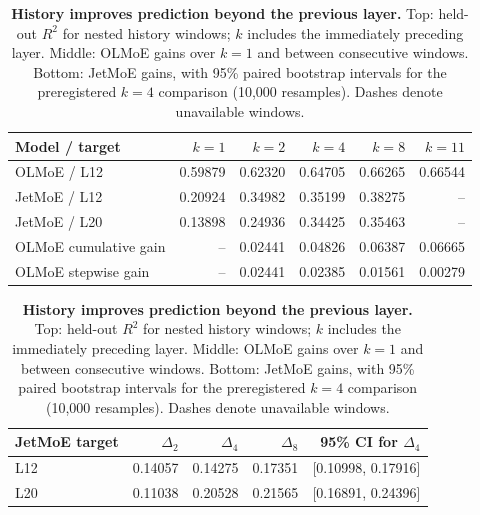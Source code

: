 \begin{table}[t]
\centering\small
\caption{\textbf{History improves prediction beyond the previous layer.} Top: held-out $R^2$ for nested history windows; $k$ includes the immediately preceding layer. Middle: OLMoE gains over $k=1$ and between consecutive windows. Bottom: JetMoE gains, with 95\% paired bootstrap intervals for the preregistered $k=4$ comparison (10,000 resamples). Dashes denote unavailable windows.}
\label{tab:history}
\begin{tabular}{lrrrrr}
\toprule
Model / target & $k=1$ & $k=2$ & $k=4$ & $k=8$ & $k=11$\\
\midrule
OLMoE / L12 & 0.59879 & 0.62320 & 0.64705 & 0.66265 & 0.66544 \\
JetMoE / L12 & 0.20924 & 0.34982 & 0.35199 & 0.38275 & -- \\
JetMoE / L20 & 0.13898 & 0.24936 & 0.34425 & 0.35463 & -- \\
\midrule
OLMoE cumulative gain & -- & 0.02441 & 0.04826 & 0.06387 & 0.06665 \\
OLMoE stepwise gain & -- & 0.02441 & 0.02385 & 0.01561 & 0.00279 \\
\bottomrule
\end{tabular}
\par\smallskip
\begin{tabular}{lrrrr}
\toprule
JetMoE target & $\Delta_2$ & $\Delta_4$ & $\Delta_8$ & 95\% CI for $\Delta_4$\\
\midrule
L12 & 0.14057 & 0.14275 & 0.17351 & [0.10998, 0.17916] \\
L20 & 0.11038 & 0.20528 & 0.21565 & [0.16891, 0.24396] \\
\bottomrule
\end{tabular}
\end{table}
